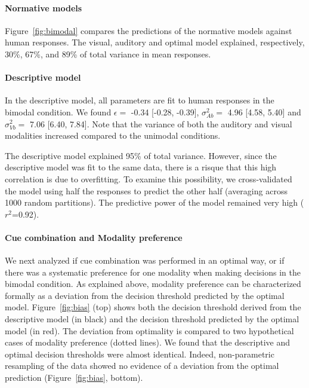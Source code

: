 \documentclass[english,man]{apa6}
\theoremstyle{definition}
\theoremstyle{definition}
\theoremstyle{definition}
\theoremstyle{remark}
\begin{document}
\paragraph{Normative models}\label{normative-models}

Figure~\ref{fig:bimodal} compares the predictions of the normative
models against human responses. The visual, auditory and optimal model
explained, respectively, 30\%, 67\%, and 89\% of total variance in mean
responses.

\paragraph{Descriptive model}\label{descriptive-model-1}

In the descriptive model, all parameters are fit to human responses in
the bimodal condition. We found \(\epsilon=\) -0.34 {[}-0.28, -0.39{]},
\(\sigma^2_{Ab}=\) 4.96 {[}4.58, 5.40{]} and \(\sigma^2_{Vb}=\) 7.06
{[}6.40, 7.84{]}. Note that the variance of both the auditory and visual
modalities increased compared to the unimodal conditions.

The descriptive model explained 95\% of total variance. However, since
the descriptive model was fit to the same data, there is a risque that
this high correlation is due to overfitting. To examine this
possibility, we cross-validated the model using half the responses to
predict the other half (averaging across 1000 random partitions). The
predictive power of the model remained very high (\(r^2\)=0.92).

\paragraph{Cue combination and Modality
preference}\label{cue-combination-and-modality-preference}

We next analyzed if cue combination was performed in an optimal way, or
if there was a systematic preference for one modality when making
decisions in the bimodal condition. As explained above, modality
preference can be characterized formally as a deviation from the
decision threshold predicted by the optimal model. Figure~\ref{fig:bias}
(top) shows both the decision threshold derived from the descriptive
model (in black) and the decision threshold predicted by the optimal
model (in red). The deviation from optimality is compared to two
hypothetical cases of modality preference (dotted lines). We found that
the descriptive and optimal decision thresholds were almost identical.
Indeed, non-parametric resampling of the data showed no evidence of a
deviation from the optimal prediction (Figure~\ref{fig:bias}, bottom).
\end{document}
